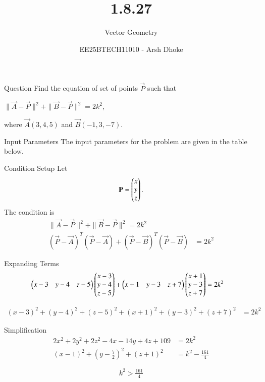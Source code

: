 \documentclass{beamer}
\title{1.8.27}
\subtitle{Vector Geometry}
\author{EE25BTECH11010 - Arsh Dhoke}
\date{}
\begin{document}
\begin{frame}
\titlepage
\end{frame}

\begin{frame}{Question}
Find the equation of set of points $\vec{P}$ such that 

$\|\vec{A}-\vec{P}\|^2 + \|\vec{B}-\vec{P}\|^2 = 2k^2$,

where $\vec{A}(3,4,5)$ and $\vec{B}(-1,3,-7)$.
\end{frame}

\begin{frame}{Input Parameters}
The input parameters for the problem are given in the table below.

\end{frame}

\begin{frame}{Condition Setup}
Let 
\[
\mathbf{P} = \begin{pmatrix}x \\ y \\ z\end{pmatrix}.
\]
The condition is
\begin{align}
\|\vec{A}-\vec{P}\|^2 + \|\vec{B}-\vec{P}\|^2 = 2k^2 \\
(\vec{P}-\vec{A})^T(\vec{P}-\vec{A}) + (\vec{P}-\vec{B})^T(\vec{P}-\vec{B}) &= 2k^2
\end{align}
\end{frame}

\begin{frame}{Expanding Terms}
\begin{align}
\begin{pmatrix}x-3 & y-4 & z-5\end{pmatrix}\begin{pmatrix}x-3\\y-4\\z-5\end{pmatrix}
+ 
\begin{pmatrix}x+1 & y-3 & z+7\end{pmatrix}\begin{pmatrix}x+1\\y-3\\z+7\end{pmatrix}
&= 2k^2
\end{align}

\begin{align}
(x-3)^2 + (y-4)^2 + (z-5)^2 + (x+1)^2 + (y-3)^2 + (z+7)^2 &= 2k^2
\end{align}
\end{frame}

\begin{frame}{Simplification}
\begin{align}
2x^2 + 2y^2 + 2z^2 - 4x - 14y + 4z + 109 &= 2k^2 \\
(x-1)^2 + \left(y-\tfrac{7}{2}\right)^2 + (z+1)^2 &= k^2 - \tfrac{161}{4}
\end{align}

\[
k^2 > \tfrac{161}{4}
\]
\end{frame}
\end{document}
